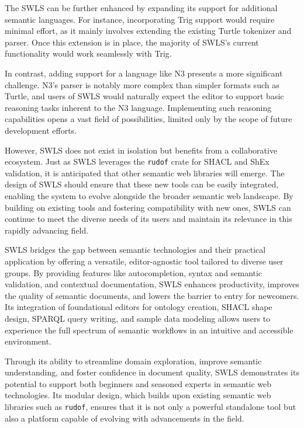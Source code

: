 The SWLS can be further enhanced by expanding its support for additional semantic languages.
For instance, incorporating Trig support would require minimal effort, as it mainly involves extending the existing Turtle tokenizer and parser.
Once this extension is in place, the majority of SWLS’s current functionality would work seamlessly with Trig.

In contrast, adding support for a language like N3 presents a more significant challenge.
N3’s parser is notably more complex than simpler formats such as Turtle, and users of SWLS would naturally expect the editor to support basic reasoning tasks inherent to the N3 language.
Implementing such reasoning capabilities opens a vast field of possibilities, limited only by the scope of future development efforts.

However, SWLS does not exist in isolation but benefits from a collaborative ecosystem.
Just as SWLS leverages the \texttt{rudof} crate for SHACL and ShEx validation, it is anticipated that other semantic web libraries will emerge.
The design of SWLS should ensure that these new tools can be easily integrated, enabling the system to evolve alongside the broader semantic web landscape.
By building on existing tools and fostering compatibility with new ones, SWLS can continue to meet the diverse needs of its users and maintain its relevance in this rapidly advancing field.



SWLS bridges the gap between semantic technologies and their practical application by offering a versatile, editor-agnostic tool tailored to diverse user groups.
By providing features like autocompletion, syntax and semantic validation, and contextual documentation, SWLS enhances productivity, improves the quality of semantic documents, and lowers the barrier to entry for newcomers.
Its integration of foundational editors for ontology creation, SHACL shape design, SPARQL query writing, and sample data modeling allows users to experience the full spectrum of semantic workflows in an intuitive and accessible environment.

Through its ability to streamline domain exploration, improve semantic understanding, and foster confidence in document quality, SWLS demonstrates its potential to support both beginners and seasoned experts in semantic web technologies.
Its modular design, which builds upon existing semantic web libraries such as \texttt{rudof}, ensures that it is not only a powerful standalone tool but also a platform capable of evolving with advancements in the field.




